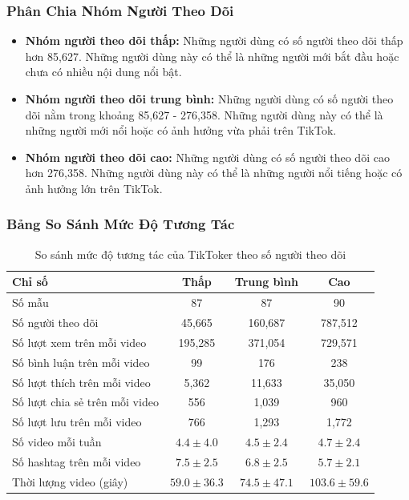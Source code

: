 \subsubsection{Phân Chia Nhóm Người Theo Dõi}
\begin{itemize}
    \item \textbf{Nhóm người theo dõi thấp:} Những người dùng có số người theo dõi thấp hơn 85,627. Những người dùng này có thể là những người mới bắt đầu hoặc chưa có nhiều nội dung nổi bật.
    
    \item \textbf{Nhóm người theo dõi trung bình:} Những người dùng có số người theo dõi nằm trong khoảng 85,627 - 276,358. Những người dùng này có thể là những người mới nổi hoặc có ảnh hưởng vừa phải trên TikTok.
    
    \item \textbf{Nhóm người theo dõi cao:} Những người dùng có số người theo dõi cao hơn 276,358. Những người dùng này có thể là những người nổi tiếng hoặc có ảnh hưởng lớn trên TikTok.
\end{itemize}

\subsubsection{Bảng So Sánh Mức Độ Tương Tác}
\begin{table}[H]
    \centering
    \begin{tabular}{lccc}
        \toprule
        Chỉ số & Thấp & Trung bình & Cao \\
        \midrule
        Số mẫu & 87 & 87 & 90 \\
        Số người theo dõi & 45,665 & 160,687 & 787,512 \\
        Số lượt xem trên mỗi video & 195,285 & 371,054 & 729,571 \\
        Số bình luận trên mỗi video & 99 & 176 & 238 \\
        Số lượt thích trên mỗi video & 5,362 & 11,633 & 35,050 \\
        Số lượt chia sẻ trên mỗi video & 556 & 1,039 & 960 \\
        Số lượt lưu trên mỗi video & 766 & 1,293 & 1,772 \\
        Số video mỗi tuần & $4.4 \pm 4.0$ & $4.5 \pm 2.4$ & $4.7 \pm 2.4$ \\
        Số hashtag trên mỗi video & $7.5 \pm 2.5$ & $6.8 \pm 2.5$ & $5.7 \pm 2.1$ \\
        Thời lượng video (giây) & $59.0 \pm 36.3$ & $74.5 \pm 47.1$ & $103.6 \pm 59.6$ \\
        \bottomrule
    \end{tabular}
    \caption{So sánh mức độ tương tác của TikToker theo số người theo dõi}
    \label{tab:so_sanh_tuong_tac}
\end{table}

